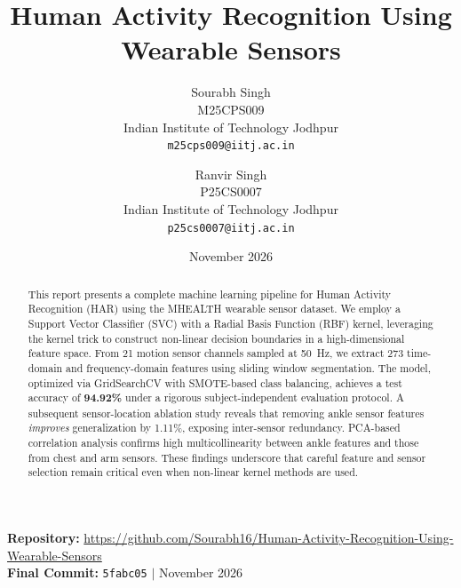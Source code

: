 \documentclass[10pt,twocolumn,letterpaper]{article}
\begin{document}
\title{Human Activity Recognition Using Wearable Sensors}

\author{
Sourabh Singh\\
M25CPS009\\
Indian Institute of Technology Jodhpur\\
{\tt\small m25cps009@iitj.ac.in}
\and
Ranvir Singh\\
P25CS0007\\
Indian Institute of Technology Jodhpur\\
{\tt\small p25cs0007@iitj.ac.in}
}

\date{November 2026}

\maketitle

\begin{center}
{\small \textbf{Repository:} \url{https://github.com/Sourabh16/Human-Activity-Recognition-Using-Wearable-Sensors}}\\[2pt]
{\small \textbf{Final Commit:} \texttt{5fabc05} $\mid$ November 2026}
\end{center}
\vspace{-2ex}

\begin{abstract}
This report presents a complete machine learning pipeline for Human Activity Recognition (HAR) using the MHEALTH wearable sensor dataset. We employ a Support Vector Classifier (SVC) with a Radial Basis Function (RBF) kernel, leveraging the kernel trick to construct non-linear decision boundaries in a high-dimensional feature space. From 21 motion sensor channels sampled at 50~Hz, we extract 273 time-domain and frequency-domain features using sliding window segmentation. The model, optimized via GridSearchCV with SMOTE-based class balancing, achieves a test accuracy of \textbf{94.92\%} under a rigorous subject-independent evaluation protocol. A subsequent sensor-location ablation study reveals that removing ankle sensor features \textit{improves} generalization by 1.11\%, exposing inter-sensor redundancy. PCA-based correlation analysis confirms high multicollinearity between ankle features and those from chest and arm sensors. These findings underscore that careful feature and sensor selection remain critical even when non-linear kernel methods are used.
\end{abstract}

\end{document}
